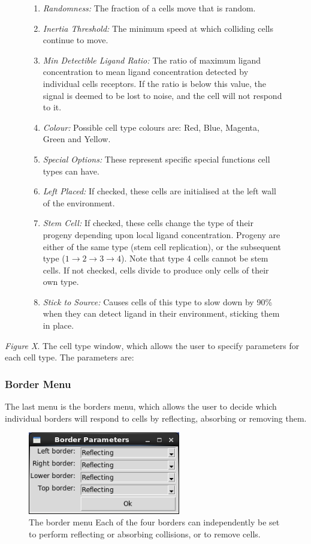 \documentclass[12pt]{article}
\begin{document}
\begin{figure}[H]
{\begin{enumerate}[topsep=2pt,itemsep=-1ex,partopsep=1ex,parsep=1ex]
derived from its last move.
\item {\itshape Randomness:} The fraction of a cells move that is random.
\item {\itshape Inertia Threshold:} The minimum speed at which colliding cells continue to move.
\item {\itshape Min Detectible Ligand Ratio:} The ratio of maximum ligand 
concentration to mean ligand concentration detected by individual cells 
receptors. If the ratio is below this value, the signal is 
deemed to be lost to noise, and the cell will not respond to it.
\item {\itshape Colour:} Possible cell type colours are: Red, Blue, Magenta, Green and 
Yellow.
\item {\itshape Special Options:} These represent specific special 
functions cell types can have.
\item {\itshape Left Placed:} If checked, these cells are initialised at the left wall of the environment.
\item {\itshape Stem Cell:} If checked, these cells change the type of their progeny depending upon local ligand 
concentration. Progeny are either of the same type (stem cell replication), or the subsequent type  
(\(1 \rightarrow 2 \rightarrow 3 \rightarrow 4\)). Note that type 4 cells cannot be stem cells. If not checked,
cells divide to produce only cells of their own type.
\item {\itshape Stick to Source:} Causes cells of this type to slow down by 90\% when they can detect
  ligand in their environment, sticking them in place.
\end{enumerate}
}
\end{figure}

{\itshape Figure X}. The cell type window, which allows the user to 
specify parameters for each cell type. The parameters are:

\subsubsection{Border Menu}

The last menu is the borders menu, which allows the user to decide which 
individual borders will respond to cells by reflecting, absorbing or 
removing them.

\begin{figure}[H]
\centering
\includegraphics[width=6.63cm]{media/border_screen.png}
\caption[]{The border menu Each of the four 
borders can independently be set to perform reflecting or absorbing 
collisions, or to remove cells.}
\end{figure}
\end{document}
